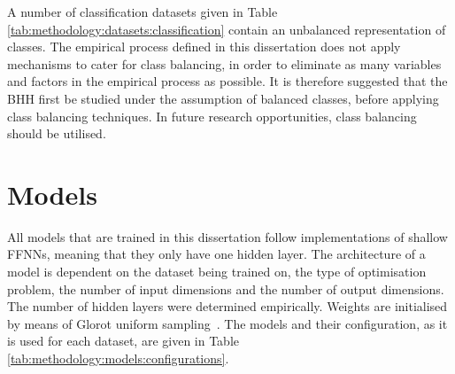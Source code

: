 A number of classification datasets given in Table \ref{tab:methodology:datasets:classification} contain an unbalanced representation of classes. The empirical process defined in this dissertation does not apply mechanisms to cater for class balancing, in order to eliminate as many variables and factors in the empirical process as possible. It is therefore suggested that the \acs{BHH} first be studied under the assumption of balanced classes, before applying class balancing techniques. In future research opportunities, class balancing should be utilised.

\section{Models}\label{sec:methodology:model}

All models that are trained in this dissertation follow implementations of shallow \acp{FFNN}, meaning that they only have one hidden layer. The architecture of a model is dependent on the dataset being trained on, the type of optimisation problem, the number of input dimensions and the number of output dimensions. The number of hidden layers were determined empirically. Weights are initialised by means of Glorot uniform sampling~\cite{ref:glorot:2010}. The models and their configuration, as it is used for each dataset, are given in Table \ref{tab:methodology:models:configurations}.

